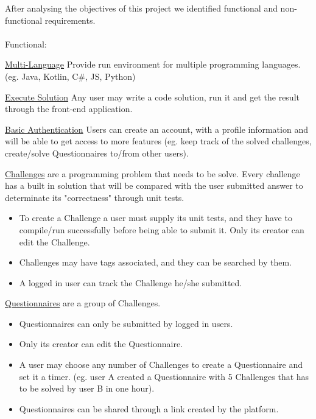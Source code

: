 \renewcommand{\labelitemii}{$\star$}
After analysing the objectives of this project we identified functional and non-functional requirements.
\\
\\
Functional:
\begin{description}[font=$\bullet$~\normalfont\scshape\color{red!50!black}]
\item \underline{Multi-Language} Provide run environment for multiple programming languages.(eg. Java, Kotlin, C\#, JS, Python)

\item \underline{Execute Solution} Any user may write a code solution, run it and get the result through the front-end application.

\item \underline {Basic Authentication} Users can create an account, with a profile information and will be able to get access to more features (eg. keep track of the solved challenges, create/solve Questionnaires to/from other users).

\item \underline{Challenges} are a programming problem that needs to be solve. Every challenge has a built in solution that will be compared with the user submitted answer to determinate its "correctness" through unit tests.
   \begin{itemize}
     \item To create a Challenge a user must supply its unit tests, and they have to compile/run successfully before being able to submit it. Only its creator can edit the Challenge.
     \item Challenges may have tags associated, and they can be searched by them.
     \item A logged in user can track the Challenge he/she submitted.
   \end{itemize}
\item \underline{Questionnaires} are a group of Challenges.
	\begin{itemize}
	\item Questionnaires can only be submitted by logged in users.
	\item Only its creator can edit the Questionnaire.
    \item A user may choose any number of Challenges to create a Questionnaire and set it a timer. 
    (eg. user A created a Questionnaire with 5 Challenges that has to be solved by user B in one hour).
    \item Questionnaires can be shared through a link created by the platform.
	\end{itemize}
\end{description}

